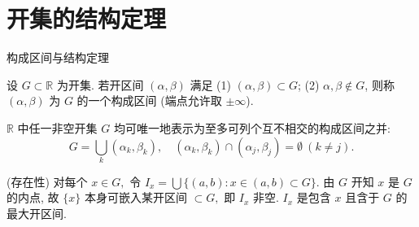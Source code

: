 
\section[结构定理]{开集的结构定理}


\begin{frame}{构成区间与结构定理}

\begin{Def}[构成区间]
设 $G \subset \mathbb{R}$ 为开集. 若开区间 $(\alpha, \beta)$ 满足
(1) $(\alpha, \beta) \subset G$; \quad (2) $\alpha, \beta \notin G$,
则称 $(\alpha, \beta)$ 为 $G$ 的一个\alert{构成区间} (端点允许取 $\pm\infty$).
\end{Def}

\pause

\begin{thm}
$\mathbb{R}$ 中任一非空开集 $G$ 均可\alert{唯一}地表示为至多可列个互不相交的构成区间之并:
\[
G = \bigcup_{k} (\alpha_k, \beta_k), \quad (\alpha_k, \beta_k) \cap (\alpha_j, \beta_j) = \emptyset\ (k \neq j).
\]
\end{thm}

\pause

\startproof[bg=yellow, fg=red](存在性)
对每个 $x \in G,$ 令 $I_x = \bigcup\{(a, b) : x \in (a, b) \subset G\}.$ 由 $G$ 开知 $x$ 是 $G$ 的内点, 故 $\{x\}$ 本身可嵌入某开区间 $\subset G,$ 即 $I_x$ 非空. $I_x$ 是包含 $x$ 且含于 $G$ 的\alert{最大}开区间.

\end{frame}


